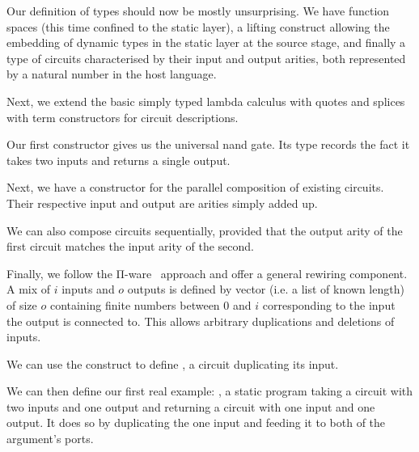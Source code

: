 \documentclass{article}
\begin{document}
Our definition of types should now be mostly unsurprising.
We have function spaces (this time confined to the static
layer), a lifting construct allowing the embedding of
dynamic types in the static layer at the source stage,
and finally a type of circuits characterised by their input
and output arities, both represented by a natural number in
the host language.


Next, we extend the basic simply typed lambda calculus with
quotes and splices with term constructors for circuit descriptions.

Our first constructor gives us the universal nand gate.
Its type records the fact it takes two inputs and returns
a single output.


Next, we have a constructor for the parallel composition
of existing circuits. Their respective input and output
are arities simply added up.


We can also compose circuits sequentially, provided
that the output arity of the first circuit matches
the input arity of the second.


Finally, we follow the Π-ware~\cite{DBLP:conf/types/FlorSS15}
approach and offer a general rewiring component.
A mix of $i$ inputs and $o$ outputs is defined by
vector (i.e. a list of known length) of size $o$
containing finite numbers between $0$ and $i$
corresponding to the input the output is connected to.
%
This allows arbitrary duplications and deletions
of inputs.



We can use the  construct to define ,
a circuit duplicating its input.


We can then define our first real example: ,
a static program taking a circuit with two inputs and
one output and returning a circuit with one input and
one output.
It does so by duplicating the one input and feeding it
to both of the argument's ports.

\end{document}
